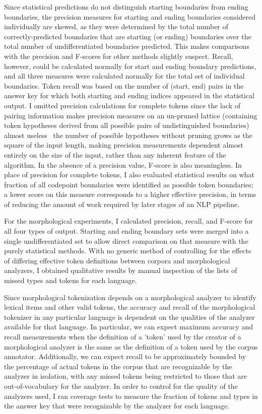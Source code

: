 Since statistical predictions do not distinguish starting boundaries from ending boundaries, the precision measures for starting and ending boundaries considered individually are skewed, as they were determined by the total number of correctly-predicted boundaries that are starting (or ending) boundaries over the total number of undifferentiated boundaries predicted. This makes comparisons with the precision and F-scores for other methods slightly suspect. Recall, however, could be calculated normally for start and ending boundary predictions, and all three measures were calculated normally for the total set of individual boundaries. Token recall was based on the number of (start, end) pairs in the answer key for which both starting and ending indices appeared in the statistical output. I omitted precision calculations for complete tokens since the lack of pairing information makes precision measures on an un-pruned lattice (containing token hypotheses derived from all possible pairs of undistinguished boundaries) almost useless\textemdash~ the number of possible hypotheses without pruning grows as the square of the input length, making precision measurements dependent almost entirely on the size of the input, rather than any inherent feature of the algorithm. In the absence of a precision value, F-score is also meaningless. In place of precision for complete tokens, I also evaluated statistical results on what fraction of all codepoint boundaries were identified as possible token boundaries; a lower score on this measure corresponds to a higher effective precision, in terms of reducing the amount of work required by later stages of an NLP pipeline.

For the morphological experiments, I calculated precision, recall, and F-score for all four types of output. Starting and ending boundary sets were merged into a single undifferentiated set to allow direct comparison on that measure with the purely statistical methods. With no generic method of controlling for the effects of differing effective token definitions between corpora and morphological analyzers, I obtained qualitative results by manual inspection of the lists of missed types and tokens for each language.

Since morphological tokenization depends on a morphological analyzer to identify lexical items and other valid tokens, the accuracy and recall of the morphological tokenizer in any particular language is dependent on the qualities of the analyzer available for that language. In particular, we can expect maximum accuracy and recall measurements when the definition of a 'token' used by the creator of a morphological analyzer is the same as the definition of a token used by the corpus annotator. Additionally, we can expect recall to be approximately bounded by the percentage of actual tokens in the corpus that are recognizable by the analyzer in isolation, with any missed tokens being restricted to those that are out-of-vocabulary for the analyzer.
In order to control for the quality of the analyzers used, I ran coverage tests to measure the fraction of tokens and types in the answer key that were recognizable by the analyzer for each language.

